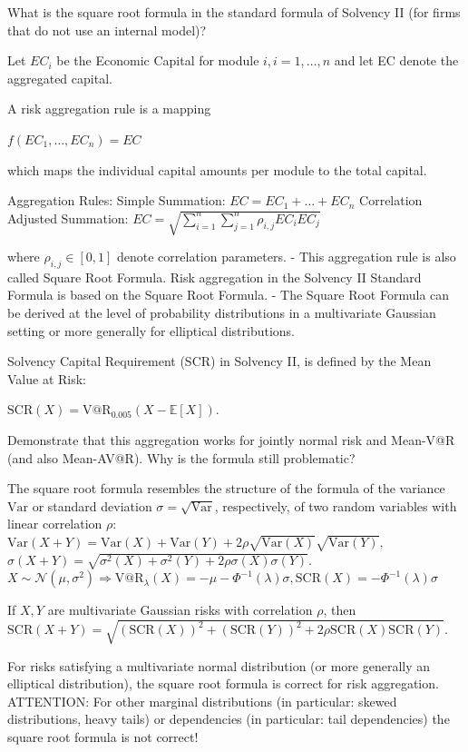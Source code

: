 What is the square root formula in the standard formula of Solvency II (for firms
that do not use an internal model)?

Let \( EC_i \) be the Economic Capital for module \( i, i = 1, \ldots, n \) and let EC denote the aggregated capital.

A risk aggregation rule is a mapping

\( f(EC_1, \ldots, EC_n) = EC \)

which maps the individual capital amounts per module to the total capital.

Aggregation Rules:
Simple Summation: \( EC = EC_1 + \ldots + EC_n \)
Correlation Adjusted Summation:
\( EC = \sqrt{\sum_{i=1}^{n} \sum_{j=1}^{n} \rho_{i,j} EC_i EC_j} \)

where \( \rho_{i,j} \in [0, 1] \) denote correlation parameters.
- This aggregation rule is also called Square Root Formula. 
  Risk aggregation in the Solvency II Standard Formula is based on the Square Root Formula.
- The Square Root Formula can be derived at the level of probability distributions in a multivariate Gaussian setting 
  or more generally for elliptical distributions.


Solvency Capital Requirement (SCR) in Solvency II, is defined by the Mean Value at Risk:

\( \text{SCR}(X) = \text{V@R}_{0.005}(X - \mathbb{E}[X]). \)


Demonstrate that this aggregation works for jointly normal risk and Mean-V@R
(and also Mean-AV@R). Why is the formula still problematic?
 
The square root formula resembles the structure of the formula of the variance \(\text{Var}\) or standard deviation \(\sigma = \sqrt{\text{Var}}\), 
respectively, of two random variables with linear correlation \(\rho\):
\(
\text{Var}(X + Y) = \text{Var}(X) + \text{Var}(Y) + 2\rho \sqrt{\text{Var}(X)} \sqrt{\text{Var}(Y)},
\)
\(
\sigma(X + Y) = \sqrt{\sigma^2(X) + \sigma^2(Y) + 2\rho \sigma(X)\sigma(Y)}.
\)
\(X \sim \mathcal{N}(\mu, \sigma^2) \Rightarrow \text{V@R}_\lambda(X) = -\mu - \Phi^{-1}(\lambda)\sigma, \text{SCR}(X) = -\Phi^{-1}(\lambda)\sigma\)

If \(X, Y\) are multivariate Gaussian risks with correlation \(\rho\), then
\(
\text{SCR}(X + Y) = \sqrt{(\text{SCR}(X))^2 + (\text{SCR}(Y))^2 + 2\rho\text{SCR}(X)\text{SCR}(Y)}.
\)

For risks satisfying a multivariate normal distribution (or more generally an elliptical distribution), the square root formula is correct for risk aggregation.
ATTENTION:
For other marginal distributions (in particular: skewed distributions, heavy tails) or dependencies 
(in particular: tail dependencies) the square root formula is not correct!



